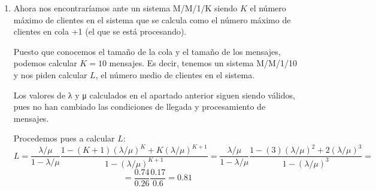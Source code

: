 \begin{problem}[6]
\begin{enumerate}
\item

Ahora nos encontraríamos ante un sistema M/M/1/K siendo $K$ el número máximo de clientes en el sistema que se calcula como el número máximo de clientes en cola +1 (el que se está procesando).

Puesto que conocemos el tamaño de la cola y el tamaño de los mensajes, podemos calcular $K=10$ mensajes. Es decir, tenemos un sistema M/M/1/10 y nos piden calcular $L$, el número medio de clientes en el sistema.

Los valores de λ y μ calculados en el apartado anterior siguen siendo válidos, pues no han cambiado las condiciones de llegada y procesamiento de mensajes.

Procedemos pues a calcular $L$:
\[L = \frac{λ/μ}{1-λ/μ}\frac{1-(K+1)(λ/μ)^K+K(λ/μ)^{K+1}}{1-(λ/μ)^{K+1}}=\frac{λ/μ}{1-λ/μ}\frac{1-(3)(λ/μ)^2+2(λ/μ)^{3}}{1-(λ/μ)^{3}}=\]
\[=\frac{0.74}{0.26}\frac{0.17}{0.6}=\boxed{0.81}\]

\end{enumerate}
\end{problem}


